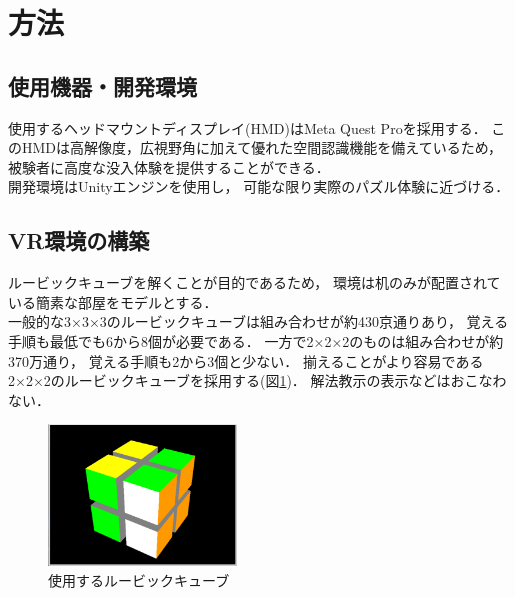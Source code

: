 \section{方法}
  \subsection{使用機器・開発環境}
    使用するヘッドマウントディスプレイ(HMD)はMeta Quest Proを採用する．
    このHMDは高解像度，広視野角に加えて優れた空間認識機能を備えているため，
    被験者に高度な没入体験を提供することができる．
    \\\indent
    開発環境はUnityエンジンを使用し，
    可能な限り実際のパズル体験に近づける．
    \\\indent

  \subsection{VR環境の構築}
    ルービックキューブを解くことが目的であるため，
    環境は机のみが配置されている簡素な部屋をモデルとする．
    \\\indent
    一般的な3×3×3のルービックキューブは組み合わせが約430京通りあり，
    覚える手順も最低でも6から8個が必要である．
    一方で2×2×2のものは組み合わせが約370万通り，
    覚える手順も2から3個と少ない．
    揃えることがより容易である
    2×2×2のルービックキューブを採用する(図\ref{cube})．
    解法教示の表示などはおこなわない．
    \begin{figure}[h]
      \begin{center}
        \includegraphics[width=50mm]{./images/cube.png}
        \caption{使用するルービックキューブ}\label{cube}
      \end{center}
    \end{figure}
